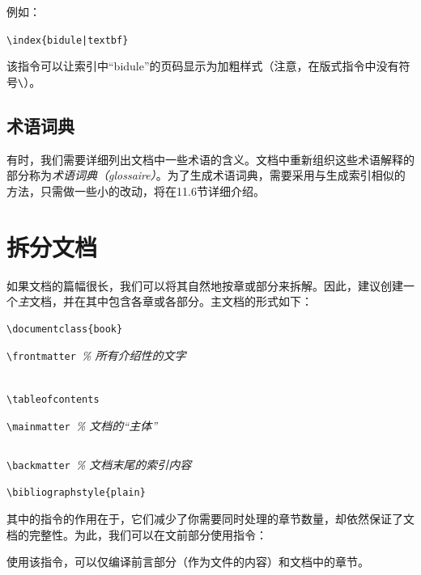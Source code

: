 例如：

\begin{dmd}
\verb+\index{bidule|textbf}+
\end{dmd}

该指令可以让索引中``bidule''的页码显示为加粗样式（注意，在版式指令中没有符号\verb|\|）。

\subsection{术语词典}

有时，我们需要详细列出文档中一些术语的含义。文档中重新组织这些术语解释的部分称为\emph{术语词典（glossaire）}。为了生成术语词典，需要采用与生成索引相似的方法，只需做一些小的改动，将在11.6节详细介绍。

\section{拆分文档}

如果文档的篇幅很长，我们可以将其自然地按章或部分来拆解。因此，建议创建一个\emph{主}文档，并在其中包含各章或各部分。主文档的形式如下：

\begin{dmd}
\begin{verbatim}
\documentclass{book}

\end{verbatim}
\verb+\frontmatter +\textsl{\% 所有介绍性的文字}
\begin{verbatim}

\tableofcontents\end{verbatim}
\verb+\mainmatter +\textsl{\% 文档的``主体''}
\begin{verbatim}

\end{verbatim}
\verb+\backmatter +\textsl{\% 文档末尾的索引内容}
\begin{verbatim}
\bibliographstyle{plain} 

\end{verbatim}
\end{dmd}

其中的指令\verb||的作用在于，它们减少了你需要同时处理的章节数量，却依然保证了文档的完整性。为此，我们可以在文前部分使用指令\verb||：

\begin{dmd}
\verb||
\end{dmd}

使用该指令，可以仅编译前言部分（作为文件的内容）和文档中的章节。

